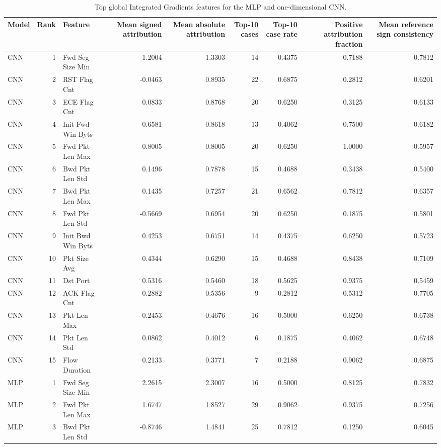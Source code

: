 \begin{table}
\caption{Top global Integrated Gradients features for the MLP and one-dimensional CNN.}
\label{tab:ig_global_top15_features}
\begin{tabular}{lrlrrrrrr}
\toprule
Model & Rank & Feature & Mean signed attribution & Mean absolute attribution & Top-10 cases & Top-10 case rate & Positive attribution fraction & Mean reference sign consistency \\
\midrule
CNN & 1 & Fwd Seg Size Min & 1.2004 & 1.3303 & 14 & 0.4375 & 0.7188 & 0.7812 \\
CNN & 2 & RST Flag Cnt & -0.0463 & 0.8935 & 22 & 0.6875 & 0.2812 & 0.6201 \\
CNN & 3 & ECE Flag Cnt & 0.0833 & 0.8768 & 20 & 0.6250 & 0.3125 & 0.6133 \\
CNN & 4 & Init Fwd Win Byts & 0.6581 & 0.8618 & 13 & 0.4062 & 0.7500 & 0.6182 \\
CNN & 5 & Fwd Pkt Len Max & 0.8005 & 0.8005 & 20 & 0.6250 & 1.0000 & 0.5957 \\
CNN & 6 & Bwd Pkt Len Std & 0.1496 & 0.7878 & 15 & 0.4688 & 0.3438 & 0.5400 \\
CNN & 7 & Bwd Pkt Len Max & 0.1435 & 0.7257 & 21 & 0.6562 & 0.7812 & 0.6357 \\
CNN & 8 & Fwd Pkt Len Std & -0.5669 & 0.6954 & 20 & 0.6250 & 0.1875 & 0.5801 \\
CNN & 9 & Init Bwd Win Byts & 0.4253 & 0.6751 & 14 & 0.4375 & 0.6250 & 0.5723 \\
CNN & 10 & Pkt Size Avg & 0.4344 & 0.6290 & 15 & 0.4688 & 0.8438 & 0.7109 \\
CNN & 11 & Dst Port & 0.5316 & 0.5460 & 18 & 0.5625 & 0.9375 & 0.5459 \\
CNN & 12 & ACK Flag Cnt & 0.2882 & 0.5356 & 9 & 0.2812 & 0.5312 & 0.7705 \\
CNN & 13 & Pkt Len Max & 0.2453 & 0.4676 & 16 & 0.5000 & 0.6250 & 0.6738 \\
CNN & 14 & Pkt Len Std & 0.0862 & 0.4012 & 6 & 0.1875 & 0.4062 & 0.6748 \\
CNN & 15 & Flow Duration & 0.2133 & 0.3771 & 7 & 0.2188 & 0.9062 & 0.6875 \\
MLP & 1 & Fwd Seg Size Min & 2.2615 & 2.3007 & 16 & 0.5000 & 0.8125 & 0.7832 \\
MLP & 2 & Fwd Pkt Len Max & 1.6747 & 1.8527 & 29 & 0.9062 & 0.9375 & 0.7256 \\
MLP & 3 & Bwd Pkt Len Std & -0.8746 & 1.4841 & 25 & 0.7812 & 0.1250 & 0.6045 \\

\end{tabular}
\end{table}
